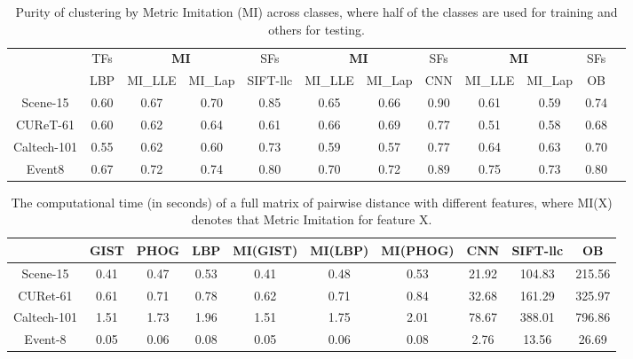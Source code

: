 \documentclass[10pt,twocolumn,letterpaper]{article}
\begin{document}
\begin{table}[!tb]
  \centering \small  \setlength{\tabcolsep}{.60em} 
  \caption{Purity of clustering by Metric Imitation (MI) across classes, where half of the classes are used for training and others for testing.}
  \begin{tabular}{c|c|ccc|ccc|cccc}
   & TFs & \multicolumn{2}{c}{\textbf{MI}} & SFs & \multicolumn{2}{c}{ \textbf{MI} } & SFs & \multicolumn{2}{c}{ \textbf{MI}} & SFs  \\   
    & LBP & MI\_LLE & MI\_Lap & SIFT-llc  & MI\_LLE & MI\_Lap & CNN &  MI\_LLE & MI\_Lap & OB     \\   \hline
     Scene-15    & 0.60  & 0.67  & 0.70  & 0.85  & 0.65  & 0.66  & 0.90    & 0.61  & 0.59  & 0.74 \\ 
    CUReT-61 & 0.60  & 0.62  & 0.64  & 0.61   & 0.66  & 0.69  & 0.77   & 0.51  & 0.58  & 0.68 \\ 
    Caltech-101 & 0.55  & 0.62  & 0.60  & 0.73  & 0.59  & 0.57  & 0.77     & 0.64  &0.63 &  0.70   \\ 
    Event8 & 0.67  & 0.72  & 0.74  & 0.80   & 0.70  & 0.72  & 0.89    & 0.75  & 0.73  & 0.80\\    \end{tabular}
  \label{tab:clustering:across}
\end{table}


\begin{table}[!tb]
  \centering \small  \setlength{\tabcolsep}{.60em} 
  \caption{The computational time (in seconds) of a full matrix of pairwise distance with different 
    features, where MI(X) denotes that Metric Imitation for feature X.   }
  \begin{tabular}{c|ccc|ccc|ccc}  
   & GIST   & PHOG &LBP &  \textbf{MI}(GIST) & \textbf{MI}(LBP)  & \textbf{MI}(PHOG) &   CNN & SIFT-llc & OB \\ \hline
 Scene-15 & 0.41    & 0.47 & 0.53  & 0.41     & 0.48 & 0.53 & 21.92 & 104.83  & 215.56   \\
 CURet-61  & 0.61  & 0.71 & 0.78    & 0.62    & 0.71 & 0.84 & 32.68 & 161.29  & 325.97   \\ 
 Caltech-101 & 1.51  & 1.73 & 1.96  & 1.51    & 1.75 & 2.01  & 78.67  & 388.01  & 796.86 \\ 
 Event-8  & 0.05    & 0.06 & 0.08  & 0.05   & 0.06 & 0.08    & 2.76 & 13.56  & 26.69  \\ 
  \end{tabular}
  \label{tab:time}
\end{table}
\end{document}

